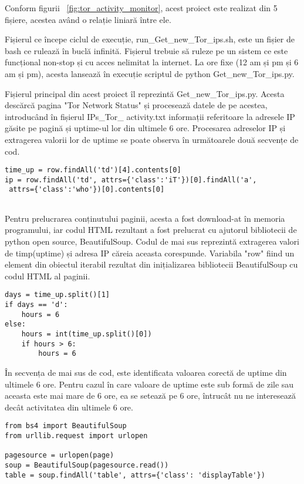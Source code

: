 Conform figurii ~\ref{fig:tor_activity_monitor},  acest proiect este realizat din 5 fișiere, acestea având o relație liniară între ele.

Fișierul ce începe ciclul de execuție,  run\_Get\_new\_Tor\_ips.sh, este un fișier de bash ce rulează în buclă infinită. Fișierul trebuie să ruleze pe un sistem ce este funcțional non-stop și cu acces nelimitat la internet. La ore fixe (12 am și pm și 6 am și pm), acesta lansează în execuție scriptul de python  Get\_new\_Tor\_ips.py.

Fișierul principal din acest proiect îl reprezintă  Get\_new\_Tor\_ips.py.  Acesta descărcă pagina "Tor Network Status" \cite{tot_status}  și procesează datele de pe acestea, introducând în fișierul IPs\_Tor\_ activity.txt  informații referitoare la adresele IP găsite pe pagină și uptime-ul lor din ultimele 6 ore. Procesarea adreselor IP și extragerea valorii lor de uptime se poate observa în următoarele două secvențe de cod. 

\lstset{language=python,frame=single, showstringspaces=false}
\begin{lstlisting}
time_up = row.findAll('td')[4].contents[0]
ip = row.findAll('td', attrs={'class':'iT'})[0].findAll('a',
 attrs={'class':'who'})[0].contents[0]


\end{lstlisting}

Pentru prelucrarea conținutului paginii, acesta a fost download-at în memoria programului, iar codul HTML rezultant a fost prelucrat cu ajutorul bibliotecii de python open source, BeautifulSoup. Codul de mai sus reprezintă extragerea valori de timp(uptime) și adresa IP căreia aceasta corespunde. Variabila "row" fiind un element din obiectul iterabil rezultat din inițializarea bibliotecii BeautifulSoup cu codul HTML al paginii. 

\lstset{language=python,frame=single, showstringspaces=false}
\begin{lstlisting}
days = time_up.split()[1]
if days == 'd':
    hours = 6
else:
    hours = int(time_up.split()[0])
    if hours > 6:
        hours = 6

\end{lstlisting}

În secvența de mai sus de cod, este identificata valoarea corectă de uptime din ultimele 6 ore. Pentru cazul în care valoare de uptime este sub formă de zile sau aceasta este mai mare de 6 ore, ea se setează pe 6 ore, întrucât nu ne interesează decât activitatea din ultimele 6 ore. 
\begin{lstlisting}
from bs4 import BeautifulSoup
from urllib.request import urlopen

pagesource = urlopen(page)
soup = BeautifulSoup(pagesource.read())
table = soup.findAll('table', attrs={'class': 'displayTable'})
\end{lstlisting}

